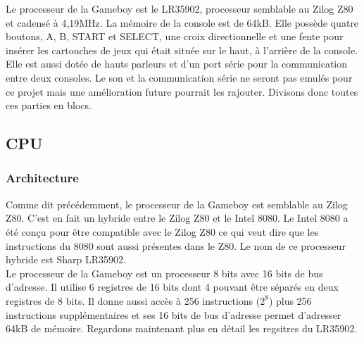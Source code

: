 \documentclass[a4paper]{article}
\begin{document}
Le processeur de la Gameboy est le LR35902, processeur semblable au Zilog Z80 et
cadensé à 4,19MHz. La mémoire de la console est de 64kB. Elle possède quatre boutons, 
A, B, START et SELECT, une croix directionnelle et une fente pour insérer les 
cartouches de jeux qui était située sur le haut, à l'arrière de la console. Elle est
aussi dotée de hauts parleurs et d'un port série pour la communication entre deux
consoles. Le son et la communication série ne seront pas emulés pour ce projet
mais une amélioration future pourrait les rajouter. Divisons donc toutes ces parties
en blocs.


\subsection{CPU}
\subsubsection{Architecture}
Comme dit précédemment, le processeur de la Gameboy est semblable au Zilog Z80.
C'est en fait un hybride entre le Zilog Z80 et le Intel 8080. Le Intel 8080 a été
conçu pour être compatible avec le Zilog Z80 ce qui veut dire que les instructions
du 8080 sont aussi présentes dans le Z80. Le nom de ce processeur hybride est Sharp
LR35902. \\

Le processeur de la Gameboy est un processeur 8 bits avec 16 bits de bus d'adresse.
Il utilise 6 registres de 16 bits dont 4 pouvant être séparés en deux registres de
8 bits. Il donne aussi accès à 256 instructions ($2^{8}$) plus 256 instructions
supplémentaires et ses 16 bits de bus d'adresse permet d'adresser 64kB de mémoire.
Regardons maintenant plus en détail les regsitres du LR35902.
\end{document}
